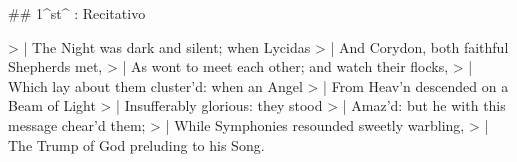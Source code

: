 ## 1^st^ \mvmt: Recitativo

\beginnumbering
\pstart
> | The Night was dark and silent; when Lycidas
> | And Corydon, both faithful Shepherds met,
> | As wont to meet each other; and watch their flocks,
> | Which lay about them cluster’d: when an Angel
> | From Heav’n descended on a Beam of Light
> | Insufferably glorious: they stood
> | Amaz’d: but he with this message chear’d them;
> | While Symphonies resounded sweetly warbling,
> | The Trump of God preluding to his Song.
\pend
\endnumbering
